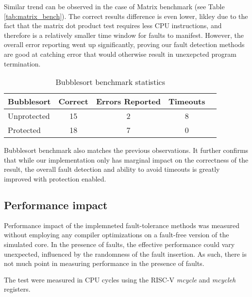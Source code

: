 Similar trend can be observed in the case of Matrix benchmark (see Table \ref{tab:matrix_bench}). The correct results difference is even lower, likley due to the fact that the matrix dot product test requires less CPU instructions, and therefore is a relatively smaller time window for faults to manifest. However, the overall error reporting went up significantly, proving our fault detection methods are good at catching error that would otherwise result in unexepcted program termination.

\begin{table}[h]
\centering
\begin{tabular}{|l|c|c|c|c|}
\hline
\textbf{Bubblesort} & \textbf{Correct} & \textbf{Errors Reported} & \textbf{Timeouts} \\
\hline
Unprotected & 15 & 2 & 8 \\
Protected & 18 & 7 & 0 \\
\hline
\end{tabular}
\caption{Bubblesort benchmark statistics}
\label{tab:bubblesort_bench}
\end{table}

Bubblesort benchmark also matches the previous observations. It further confirms that while our implementation only has marginal impact on the correctness of the result, the overall fault detection and ability to avoid timeouts is greatly improved with protection enabled.

\subsection{Performance impact}

Performance impact of the implemneted fault-tolerance methods was measured without employing any compiler optimizations on a fault-free version of the simulated core. In the presence of faults, the effective performance could vary unexpected, influenced by the randomness of the fault insertion. As such, there is not much point in measuring performance in the presence of faults.

The test were measured in CPU cycles using the RISC-V \textit{mcycle} and \textit{mcycleh} registers.

\begin{table}[h]
\centering
{}
\caption{Execution time comparison between unprotected and protected tests}
\label{tab:time_increase}
\end{table}

